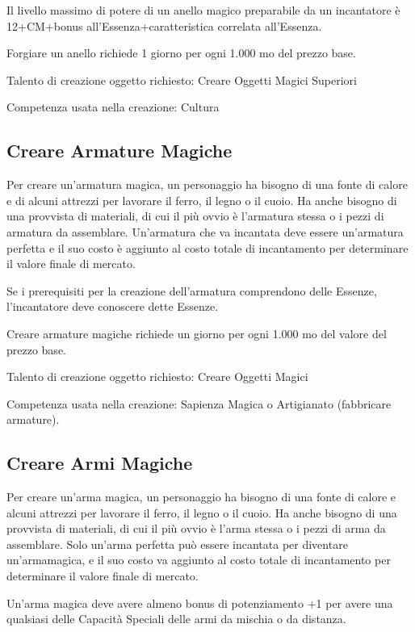 \documentclass[a4paper,11pt,twoside,openany]{book}
\begin{document}
Il livello massimo di potere di un anello magico preparabile da un incantatore è 12+CM+bonus all'Essenza+caratteristica correlata all'Essenza.

Forgiare un anello richiede 1 giorno per ogni 1.000 mo del prezzo base.

Talento di creazione oggetto richiesto: Creare Oggetti Magici Superiori

Competenza usata nella creazione: Cultura

\subsection{Creare Armature Magiche}

Per creare un'armatura magica, un personaggio ha bisogno di una fonte di calore e di alcuni attrezzi per lavorare il ferro, il legno o il cuoio. Ha anche bisogno di una provvista di materiali, di cui il più ovvio è l'armatura stessa o i pezzi di armatura da assemblare. Un'armatura che va incantata deve essere un'armatura perfetta e il suo costo è aggiunto al costo totale di incantamento per determinare il valore finale di mercato.

Se i prerequisiti per la creazione dell'armatura comprendono delle Essenze, l'incantatore deve conoscere dette Essenze.

Creare armature magiche richiede un giorno per ogni 1.000 mo del valore
del prezzo base.

Talento di creazione oggetto richiesto: Creare Oggetti Magici

Competenza usata nella creazione: Sapienza Magica o Artigianato (fabbricare armature).

\subsection{Creare Armi Magiche}

Per creare un'arma magica, un personaggio ha bisogno di una fonte di calore e alcuni attrezzi per lavorare il ferro, il legno o il cuoio. Ha anche bisogno di una provvista di materiali, di cui il più ovvio è l'arma stessa o i pezzi di arma da assemblare. Solo un'arma perfetta può essere incantata per diventare un'armamagica, e il suo costo va aggiunto al costo totale di incantamento per determinare il valore finale di mercato.

Un'arma magica deve avere almeno bonus di potenziamento +1 per avere una qualsiasi delle Capacità Speciali delle armi da mischia o da distanza.
\end{document}

